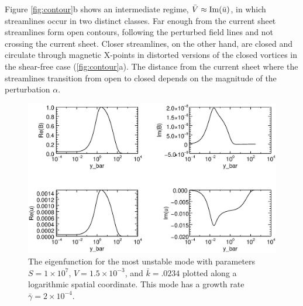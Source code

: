 	 Figure \ref{fig:contour}b shows an intermediate regime,  $\bar{V} \approx {\rm Im}(\bar{u})$, in which streamlines occur in two distinct classes. Far enough from the current sheet streamlines form open contours, following the perturbed field lines and not crossing the current sheet. Closer streamlines, on the other hand, are closed and circulate through magnetic X-points in distorted versions of the closed vortices in the shear-free case (\ref{fig:contour}a).  The distance from the current sheet where the streamlines transition from open to closed depends on the magnitude of the perturbation $\alpha$. 
	
	
	
	
	\begin{figure}[htbp]
		
		\caption{The eigenfunction for the most unstable mode with parameters $S = 1 \times 10^7$, $V = 1.5 \times 10^{-3}$, and $\bar{k} = .0234$ plotted along a logarithmic spatial coordinate. This mode has a growth rate $\bar{\gamma}= 2 \times 10^{-4}$. }
		\label{fig:eigen}
		\centerline{\includegraphics[scale=.6]{ParkerLongcope2017/TM_eigenfunction.eps}}
	\end{figure}
	
	
	
